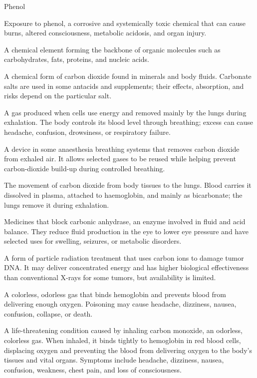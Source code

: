 \synonyms
Phenol

 Exposure to phenol, a corrosive and systemically toxic chemical that can cause burns, altered consciousness, metabolic acidosis, and organ injury.

 A chemical element forming the backbone of organic molecules such as carbohydrates, fats, proteins, and nucleic acids.

 A chemical form of carbon dioxide found in minerals and body fluids. Carbonate salts are used in some antacids and supplements; their effects, absorption, and risks depend on the particular salt.

 A gas produced when cells use energy and removed mainly by the lungs during exhalation. The body controls its blood level through breathing; excess can cause headache, confusion, drowsiness, or respiratory failure.

 A device in some anaesthesia breathing systems that removes carbon dioxide from exhaled air. It allows selected gases to be reused while helping prevent carbon-dioxide build-up during controlled breathing.

 The movement of carbon dioxide from body tissues to the lungs. Blood carries it dissolved in plasma, attached to haemoglobin, and mainly as bicarbonate; the lungs remove it during exhalation.

 Medicines that block carbonic anhydrase, an enzyme involved in fluid and acid balance. They reduce fluid production in the eye to lower eye pressure and have selected uses for swelling, seizures, or metabolic disorders.

 A form of particle radiation treatment that uses carbon ions to damage tumor DNA. It may deliver concentrated energy and has higher biological effectiveness than conventional X-rays for some tumors, but availability is limited.

 A colorless, odorless gas that binds hemoglobin and prevents blood from delivering enough oxygen. Poisoning may cause headache, dizziness, nausea, confusion, collapse, or death.

 A life-threatening condition caused by inhaling carbon monoxide, an odorless, colorless gas. When inhaled, it binds tightly to hemoglobin in red blood cells, displacing oxygen and preventing the blood from delivering oxygen to the body's tissues and vital organs. Symptoms include headache, dizziness, nausea, confusion, weakness, chest pain, and loss of consciousness.

